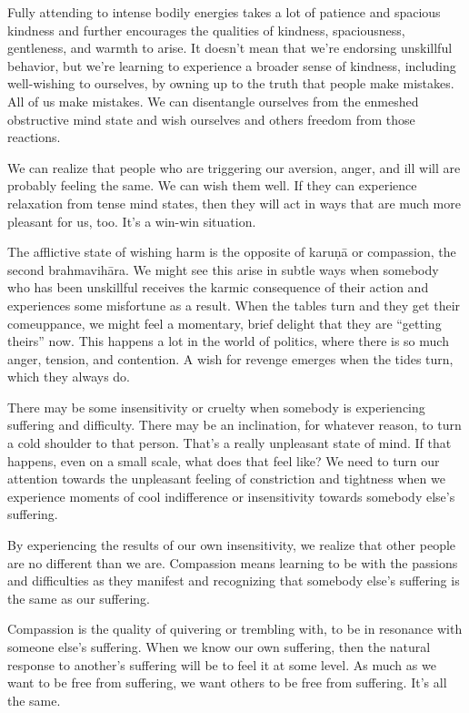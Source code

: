 Fully attending to intense bodily energies takes a lot of patience and spacious kindness and further encourages the qualities of kindness, spaciousness, gentleness, and warmth to arise. It doesn't mean that we're endorsing unskillful behavior, but we're learning to experience a broader sense of kindness, including well-wishing to ourselves, by owning up to the truth that people make mistakes. All of us make mistakes. We can disentangle ourselves from the enmeshed obstructive mind state and wish ourselves and others freedom from those reactions.

We can realize that people who are triggering our aversion, anger, and ill will are probably feeling the same. We can wish them well. If they can experience relaxation from tense mind states, then they will act in ways that are much more pleasant for us, too. It's a win-win situation.

The afflictive state of wishing harm is the opposite of karuṇā or compassion, the second brahmavihāra. We might see this arise in subtle ways when somebody who has been unskillful receives the karmic consequence of their action and experiences some misfortune as a result. When the tables turn and they get their comeuppance, we might feel a momentary, brief delight that they are ``getting theirs'' now. This happens a lot in the world of politics, where there is so much anger, tension, and contention. A wish for revenge emerges when the tides turn, which they always do.

There may be some insensitivity or cruelty when somebody is experiencing suffering and difficulty. There may be an inclination, for whatever reason, to turn a cold shoulder to that person. That's a really unpleasant state of mind. If that happens, even on a small scale, what does that feel like? We need to turn our attention towards the unpleasant feeling of constriction and tightness when we experience moments of cool indifference or insensitivity towards somebody else's suffering.

By experiencing the results of our own insensitivity, we realize that other people are no different than we are. Compassion means learning to be with the passions and difficulties as they manifest and recognizing that somebody else's suffering is the same as our suffering.

Compassion is the quality of quivering or trembling with, to be in resonance with someone else's suffering. When we know our own suffering, then the natural response to another's suffering will be to feel it at some level. As much as we want to be free from suffering, we want others to be free from suffering. It's all the same.

